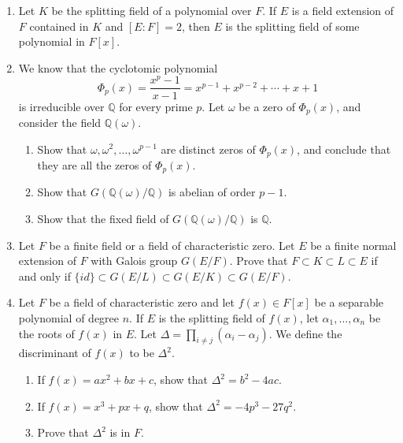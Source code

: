 {\begin{enumerate}
\item
Let $K$ be the splitting field of a polynomial over $F$. If $E$ is a
field extension of $F$ contained in $K$ and $[E:F] = 2$, then $E$ is
the splitting field of some polynomial in $F[x]$.
 
  
 
\item
We know that the cyclotomic polynomial
\[
\Phi_p(x) = \frac{x^p - 1}{x-1} = x^{p-1} + x^{p-2} + \cdots
+ x + 1
\]
is irreducible over ${\mathbb Q}$ for every prime $p$. Let $\omega$ be a
zero of $\Phi_p(x)$, and consider the field ${\mathbb Q}(\omega)$.
\begin{enumerate}
 
 \item
Show that $\omega, \omega^2, \ldots, \omega^{p-1}$ are distinct zeros of
$\Phi_p(x)$, and conclude that they are all the zeros of $\Phi_p(x)$.
 
 \item
Show that $G( {\mathbb Q}( \omega ) / {\mathbb Q} )$ is abelian of order
$p-1$. 
 
 \item
Show that the fixed field of $G( {\mathbb Q}( \omega ) / {\mathbb Q} )$ is
${\mathbb Q}$. 
 
\end{enumerate}
 
  
\item
Let $F$ be a finite field or a field of characteristic zero.
Let $E$ be a finite normal extension of $F$ with Galois group
$G(E/F)$. Prove that $F \subset K \subset L \subset E$ if and 
only if $\{ id \} \subset G(E/L) \subset G(E/K) \subset G(E/F)$.
 
 
\item
Let $F$ be a field of characteristic zero and let $f(x) \in F[x]$ be
a separable polynomial of degree $n$. If $E$ is the splitting field
of $f(x)$, let $\alpha_1, \ldots, \alpha_n$ be the roots of $f(x)$ in
$E$. Let $\Delta = \prod_{i \neq j} (\alpha_i - \alpha_j)$.  We
define the {\bfi discriminant\/}\label{discriminant} of $f(x)$ to be $\Delta^2$. 
\begin{enumerate}
 
 \item
If $f(x) = a x^2 + b x + c$, show that $\Delta^2 = b^2 - 4ac$.
 
 \item
If $f(x) = x^3 + p x + q$, show that $\Delta^2 = - 4p^3 - 27q^2$.
 
 \item
Prove that $\Delta^2$ is in $F$.
 

\end{enumerate}
\end{enumerate}}
